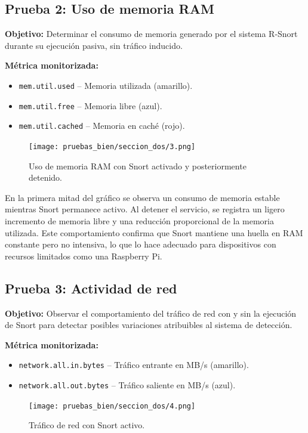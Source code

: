 \documentclass[11pt,a4paper,twoside]{report}
\begin{document}
\subsection*{Prueba 2: Uso de memoria RAM}

\textbf{Objetivo:}  
Determinar el consumo de memoria generado por el sistema R-Snort durante su ejecución pasiva, sin tráfico inducido.\newline

\textbf{Métrica monitorizada:}
\begin{itemize}
	\item \texttt{mem.util.used} – Memoria utilizada (amarillo).
	\item \texttt{mem.util.free} – Memoria libre (azul).
	\item \texttt{mem.util.cached} – Memoria en caché (rojo).
\end{itemize}

\begin{figure}[H]
	\centering
	\texttt{[image: pruebas\_bien/seccion\_dos/3.png]}
	\caption{Uso de memoria RAM con Snort activado y posteriormente detenido.}
\end{figure}

En la primera mitad del gráfico se observa un consumo de memoria estable mientras Snort permanece activo. Al detener el servicio, se registra un ligero incremento de memoria libre y una reducción proporcional de la memoria utilizada. Este comportamiento confirma que Snort mantiene una huella en RAM constante pero no intensiva, lo que lo hace adecuado para dispositivos con recursos limitados como una Raspberry Pi.

\subsection*{Prueba 3: Actividad de red}

\textbf{Objetivo:}
Observar el comportamiento del tráfico de red con y sin la ejecución de Snort para detectar posibles variaciones atribuibles al sistema de detección.

\textbf{Métrica monitorizada:} \begin{itemize} \item \texttt{network.all.in.bytes} – Tráfico entrante en MB/s (amarillo). \item \texttt{network.all.out.bytes} – Tráfico saliente en MB/s (azul). \end{itemize}

\begin{figure}[H] \centering \texttt{[image: pruebas\_bien/seccion\_dos/4.png]} \caption{Tráfico de red con Snort activo.} \end{figure}
\end{document}

